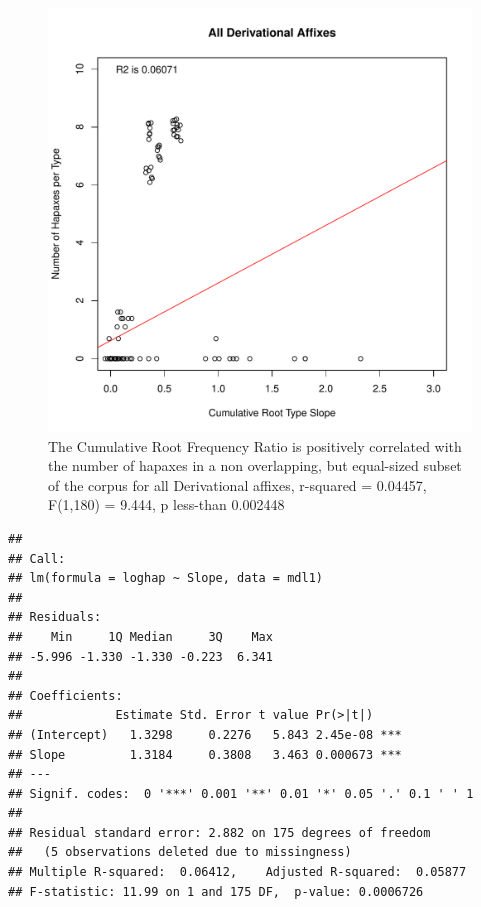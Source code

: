 \documentclass[12pt]{article}\usepackage[]{graphicx}\usepackage[]{color}
\makeatletter
\def\maxwidth{ %
  \ifdim\Gin@nat@width>\linewidth
    \linewidth
  \else
    \Gin@nat@width
  \fi
}
\newenvironment{kframe}{%
 \def\at@end@of@kframe{}%
 \ifinner\ifhmode%
  \def\at@end@of@kframe{\end{minipage}}%
  \begin{minipage}{\columnwidth}%
 \fi\fi%
 \def\FrameCommand##1{\hskip\@totalleftmargin \hskip-\fboxsep
 \colorbox{shadecolor}{##1}\hskip-\fboxsep
     \hskip-\linewidth \hskip-\@totalleftmargin \hskip\columnwidth}%
 \MakeFramed {\advance\hsize-\width
   \@totalleftmargin\z@ \linewidth\hsize
   \@setminipage}}%
 {\par\unskip\endMakeFramed%
 \at@end@of@kframe}
\newenvironment{knitrout}{}{} %
\makeatother
\begin{document}
\begin{knitrout}
\color{fgcolor}\begin{figure}
\includegraphics[width=\maxwidth]{figure/HapaxDataDerivationSlope-1} \caption[The Cumulative Root Frequency Ratio is positively correlated with the number of hapaxes in a non overlapping, but equal-sized subset of the corpus for all Derivational affixes, r-squared = 0.04457, F(1,180) = 9.444, p less-than 0.002448]{The Cumulative Root Frequency Ratio is positively correlated with the number of hapaxes in a non overlapping, but equal-sized subset of the corpus for all Derivational affixes, r-squared = 0.04457, F(1,180) = 9.444, p less-than 0.002448}\label{fig:HapaxDataDerivationSlope}
\end{figure}

\begin{kframe}\begin{verbatim}
## 
## Call:
## lm(formula = loghap ~ Slope, data = mdl1)
## 
## Residuals:
##    Min     1Q Median     3Q    Max 
## -5.996 -1.330 -1.330 -0.223  6.341 
## 
## Coefficients:
##             Estimate Std. Error t value Pr(>|t|)    
## (Intercept)   1.3298     0.2276   5.843 2.45e-08 ***
## Slope         1.3184     0.3808   3.463 0.000673 ***
## ---
## Signif. codes:  0 '***' 0.001 '**' 0.01 '*' 0.05 '.' 0.1 ' ' 1
## 
## Residual standard error: 2.882 on 175 degrees of freedom
##   (5 observations deleted due to missingness)
## Multiple R-squared:  0.06412,	Adjusted R-squared:  0.05877 
## F-statistic: 11.99 on 1 and 175 DF,  p-value: 0.0006726
\end{verbatim}
\end{kframe}
\end{knitrout}
\end{document}
